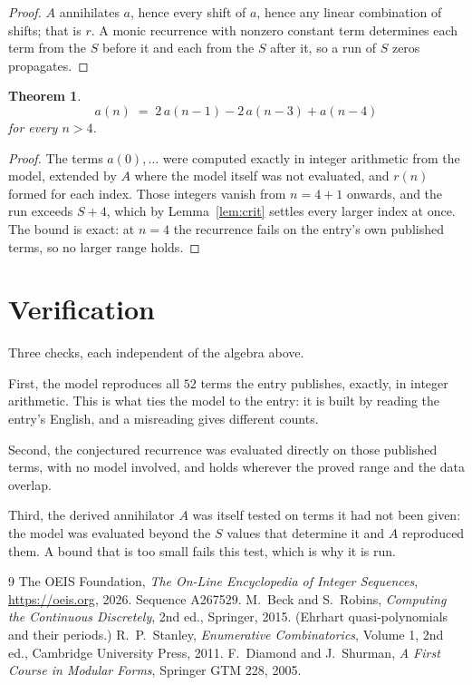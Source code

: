 \documentclass[11pt,a4paper]{article}
\theoremstyle{plain}
\newtheorem{theorem}{Theorem}
\theoremstyle{definition}
\begin{document}
\begin{proof}
$A$ annihilates $a$, hence every shift of $a$, hence any linear combination of shifts; that is
$r$. A monic recurrence with nonzero constant term determines each term from the $S$ before it
and each from the $S$ after it, so a run of $S$ zeros propagates.
\end{proof}

\begin{theorem}
\[
a(n)\;=\;2\,a(n-1) - 2\,a(n-3) + a(n-4)
\]
for every $n>4$.
\end{theorem}

\begin{proof}
The terms $a(0),\dots$ were computed exactly in integer arithmetic from the model, extended by
$A$ where the model itself was not evaluated, and $r(n)$ formed for each index. Those integers
vanish from $n=4+1$ onwards, and the run exceeds $S+4$, which by
Lemma~\ref{lem:crit} settles every larger index at once. The bound is exact: at $n=4$ the recurrence fails on the entry's own published terms, so no larger range holds.
\end{proof}

\section{Verification}

Three checks, each independent of the algebra above.

First, the model reproduces all $52$ terms the entry publishes, exactly, in integer
arithmetic. This is what ties the model to the entry: it is built by reading the entry's
English, and a misreading gives different counts.

Second, the conjectured recurrence was evaluated directly on those published terms, with no
model involved, and holds wherever the proved range and the data overlap.

Third, the derived annihilator $A$ was itself tested on terms it had not been given: the model
was evaluated beyond the $S$ values that determine it and $A$ reproduced them. A bound that is
too small fails this test, which is why it is run.

\begin{thebibliography}{9}
 The OEIS Foundation, \emph{The On-Line Encyclopedia of Integer
Sequences}, \url{https://oeis.org}, 2026. Sequence A267529.
 M.~Beck and S.~Robins, \emph{Computing the Continuous Discretely},
2nd ed., Springer, 2015. (Ehrhart quasi-polynomials and their periods.)
 R.~P.~Stanley, \emph{Enumerative Combinatorics}, Volume 1, 2nd ed.,
Cambridge University Press, 2011.
 F.~Diamond and J.~Shurman, \emph{A First Course in Modular Forms},
Springer GTM 228, 2005.
\end{thebibliography}
\end{document}
